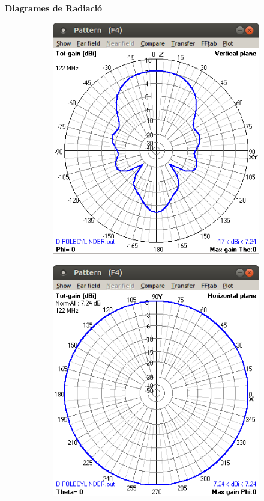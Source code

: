   \textbf{Diagrames de Radiació}

	\begin{figure}[H]
	\centering
	  \begin{subfigure}[b]{0.32\textwidth}
	  \includegraphics[width=\textwidth]{./images/3.Dypole_cylinder/3_vertical.png}
	  \caption{}
	  \label{1diag1}
	  \end{subfigure}
	  \qquad %
	  \begin{subfigure}[b]{0.32\textwidth}
	  \includegraphics[width=\textwidth]{./images/3.Dypole_cylinder/3_horizontal.png}

\end{subfigure}
\end{figure}
